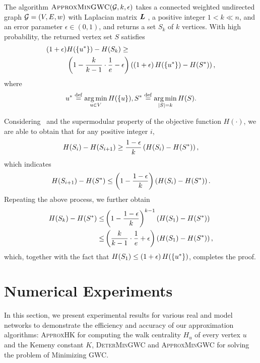 \documentclass[10pt,twocolumn,twoside]{IEEEtran}
\begin{document}
\begin{theorem}\label{Mainthm}
    The algorithm \(\textsc{ApproxMinGWC}(\mathcal{G},k,\epsilon)\) takes a connected weighted undirected graph \(\mathcal{G}=(V,E,w)\) with Laplacian matrix \(\boldsymbol{L}\) , a positive integer \(1<k \ll n\), and an error parameter \(\epsilon\in(0,1)\), and returns a set  \(S_k\) of \(k\) vertices. With high probability, the returned vertex set \(S\) satisfies
    \begin{align*}
        \left( 1+\epsilon \right) & H(\left\{u^* \right\})-H(S_k)\ge                                                                         \\
                           & \left( 1-\frac{k}{k-1}\cdot\frac{1}{e}-\epsilon \right)\left( \left( 1+\epsilon \right)H(\left\{u^* \right\})-H(S^*) \right),
    \end{align*}
    where
    \[u^*\stackrel{\mathrm{def}}{=}\operatorname*{arg\,min}_{u\in V}H(\left\{u \right\}), S^*\stackrel{\mathrm{def}}{=}\operatorname*{arg\,min}_{\left|S \right|=k}H(S).\]
\end{theorem}
\begin{IEEEproof}
    Considering~ and the supermodular property of the objective function $H(\cdot)$, we are able to obtain  that for any positive integer \(i\),
    \begin{equation*}
        H(S_i)-H(S_{i+1})\ge\frac{1-\epsilon}{k}\left( H(S_i)-H(S^*) \right),
    \end{equation*}
    which indicates
    \begin{equation*}
        H(S_{i+1})-H(S^*)\le\left( 1-\frac{1-\epsilon}{k} \right)\left( H(S_i)-H(S^*) \right).
    \end{equation*}
    Repeating the above process, we  further obtain
    \begin{align*}
        H(S_k)-H(S^*) \le & \left( 1-\frac{1-\epsilon}{k} \right)^{k-1}\left( H(S_1)-H(S^*) \right)            \\
        \le                       & \left( \frac{k}{k-1}\cdot\frac{1}{e}+\epsilon \right)\left( H(S_1)-H(S^*) \right),
    \end{align*}
    which, together with  the fact that \(H(S_1)\le\left( 1+\epsilon \right)H(\left\{u^* \right\})\),
    completes the proof.
\end{IEEEproof}


\section{Numerical Experiments}

In this section, we present experimental results for various real and model networks to demonstrate the  efficiency and accuracy of our  approximation algorithms:  \textsc{ApproxHK} for computing the walk centrality \(H_u\) of  every vertex $u$ and the Kemeny constant \(K\), \textsc{DeterMinGWC} and \textsc{ApproxMinGWC} for solving the problem of Minimizing GWC.
\end{document}
